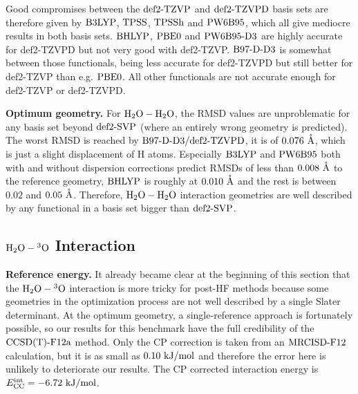 Good compromises between the $\text{def2-TZVP}$ and $\text{def2-TZVPD}$ basis sets
are therefore given by $\text{B3LYP}$, $\text{TPSS}$, $\text{TPSSh}$ and $\text{PW6B95}$, which all give
mediocre results in both basis sets. $\text{BHLYP}$, $\text{PBE0}$ and $\text{PW6B95}\text{-D3}$ are highly
accurate for def2-TZVPD but not very good with def2-TZVP. $\text{B97-D}\text{-D3}$ is somewhat
between those functionals, being less accurate for def2-TZVPD but still better
for def2-TZVP than e.g. $\text{PBE0}$. All other functionals are not accurate enough
for def2-TZVP or def2-TZVPD.

\textbf{Optimum geometry.} For $\mbox{\ensuremath{\text H _2 \text O-\text H _2 \text O}}$, the RMSD values are 
unproblematic for any basis set beyond $\text{def2-SVP}$ (where an entirely wrong geometry is predicted). The worst RMSD is
reached by $\text{B97-D}\text{-D3}/\text{def2-TZVPD}$, it is of \mbox{$0.076\ \mathring{\text{A}}$}, which is just a
slight displacement of H atoms. Especially $\text{B3LYP}$ and $\text{PW6B95}$ both with and
without dispersion corrections predict RMSDs of less than $0.008\ \Ang$ to the
reference geometry, $\text{BHLYP}$ is roughly at $0.010\ \mathring{\text{A}}$ and the rest is
between $0.02$ and $0.05\ \mathring{\text{A}}$. Therefore, $\mbox{\ensuremath{\text H _2 \text O-\text H _2 \text O}}$ interaction geometries
are well described by any functional in a basis set bigger than $\text{def2-SVP}$.


\subsection{$\mbox{\ensuremath{\text H _2 \text O-\hspace{.2pt} ^3\text{O}}}$ Interaction}

\textbf{Reference energy.} It already became clear at the beginning of this
section that the $\mbox{\ensuremath{\text H _2 \text O-\hspace{.2pt} ^3\text{O}}}$ interaction is more tricky for post-HF methods because
some geometries in the optimization process are not well described by a single
Slater determinant. At the optimum geometry, a single-reference approach is
fortunately possible, so our results for this benchmark have the full
credibility of the $\text{CCSD(T)-F12a}$ method. Only the CP correction is taken from an
$\text{MRCISD-F12}$ calculation, but it is as small as \mbox{$0.10\ \text {kJ/mol}$} and therefore
the error here is unlikely to deteriorate our results. The CP corrected
interaction energy is \mbox{$\ecc=-6.72\ \kmo$}.


